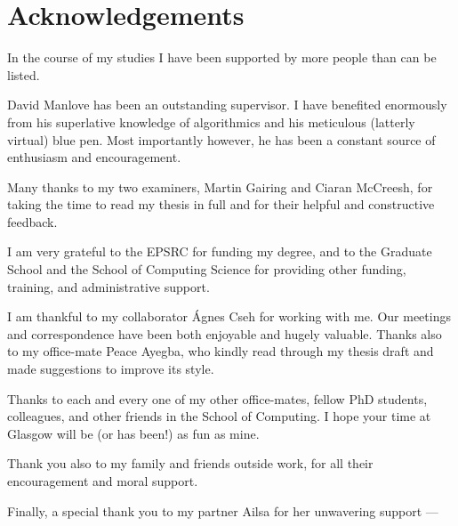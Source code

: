 \chapter*{Acknowledgements}
\ifdefined\showacknowledgements

In the course of my studies I have been supported by more people than can be listed.

David Manlove has been an outstanding supervisor. I have benefited enormously from his superlative knowledge of algorithmics and his meticulous (latterly virtual) blue pen. Most importantly however, he has been a constant source of enthusiasm and encouragement.

Many thanks to my two examiners, Martin Gairing and Ciaran McCreesh, for taking the time to read my thesis in full and for their helpful and constructive feedback.

I am very grateful to the EPSRC for funding my degree, and to the Graduate School and the School of Computing Science for providing other funding, training, and administrative support.

I am thankful to my collaborator \'Agnes Cseh for working with me. Our meetings and correspondence have been both enjoyable and hugely valuable. Thanks also to my office-mate Peace Ayegba, who kindly read through my thesis draft and made suggestions to improve its style.

Thanks to each and every one of my other office-mates, fellow PhD students, colleagues, and other friends in the School of Computing. I hope your time at Glasgow will be (or has been!) as fun as mine.

Thank you also to my family and friends outside work, for all their encouragement and moral support. 

Finally, a special thank you to my partner Ailsa for her unwavering support ---
\fi